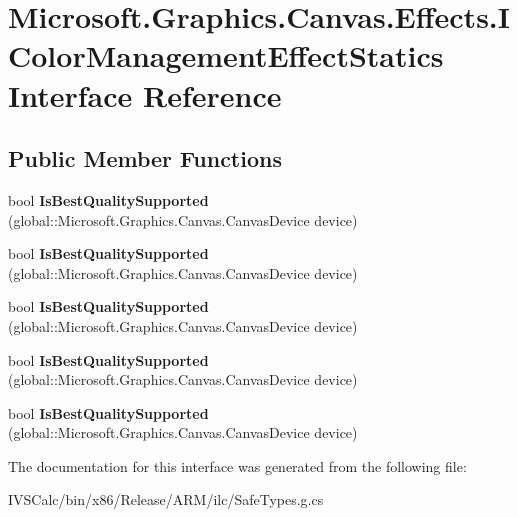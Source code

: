 \hypertarget{interface_microsoft_1_1_graphics_1_1_canvas_1_1_effects_1_1_i_color_management_effect_statics}{}\section{Microsoft.\+Graphics.\+Canvas.\+Effects.\+I\+Color\+Management\+Effect\+Statics Interface Reference}
\label{interface_microsoft_1_1_graphics_1_1_canvas_1_1_effects_1_1_i_color_management_effect_statics}
\subsection*{Public Member Functions}
\begin{DoxyCompactItemize}
\item 
\mbox{\label{interface_microsoft_1_1_graphics_1_1_canvas_1_1_effects_1_1_i_color_management_effect_statics_a04e1a853e953042219304b231c4be679}} 
bool {\bfseries Is\+Best\+Quality\+Supported} (global\+::\+Microsoft.\+Graphics.\+Canvas.\+Canvas\+Device device)
\item 
\mbox{\label{interface_microsoft_1_1_graphics_1_1_canvas_1_1_effects_1_1_i_color_management_effect_statics_a04e1a853e953042219304b231c4be679}} 
bool {\bfseries Is\+Best\+Quality\+Supported} (global\+::\+Microsoft.\+Graphics.\+Canvas.\+Canvas\+Device device)
\item 
\mbox{\label{interface_microsoft_1_1_graphics_1_1_canvas_1_1_effects_1_1_i_color_management_effect_statics_a04e1a853e953042219304b231c4be679}} 
bool {\bfseries Is\+Best\+Quality\+Supported} (global\+::\+Microsoft.\+Graphics.\+Canvas.\+Canvas\+Device device)
\item 
\mbox{\label{interface_microsoft_1_1_graphics_1_1_canvas_1_1_effects_1_1_i_color_management_effect_statics_a04e1a853e953042219304b231c4be679}} 
bool {\bfseries Is\+Best\+Quality\+Supported} (global\+::\+Microsoft.\+Graphics.\+Canvas.\+Canvas\+Device device)
\item 
\mbox{\label{interface_microsoft_1_1_graphics_1_1_canvas_1_1_effects_1_1_i_color_management_effect_statics_a04e1a853e953042219304b231c4be679}} 
bool {\bfseries Is\+Best\+Quality\+Supported} (global\+::\+Microsoft.\+Graphics.\+Canvas.\+Canvas\+Device device)
\end{DoxyCompactItemize}


The documentation for this interface was generated from the following file\+:\begin{DoxyCompactItemize}
\item 
I\+V\+S\+Calc/bin/x86/\+Release/\+A\+R\+M/ilc/Safe\+Types.\+g.\+cs\end{DoxyCompactItemize}
